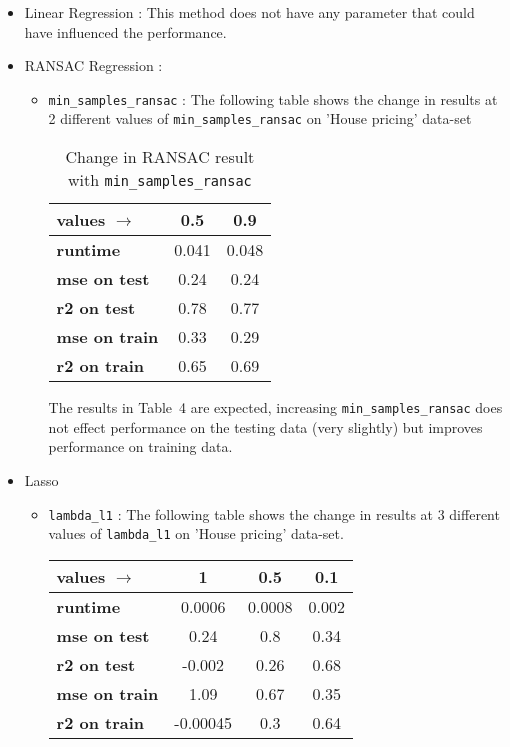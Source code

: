 \documentclass[12pt]{article}
\begin{document}
\begin{itemize}
\item Linear Regression : This method does not have any parameter that could have influenced the performance.
\item RANSAC Regression : 
\begin{itemize}
\item \texttt{min\_samples\_ransac} : The following table shows the change in results at 2 different values of \texttt{min\_samples\_ransac} on 'House pricing' data-set
\begin{table}[!hptb]
\centering
\begin{tabular}{|l|c|c|}
\hline
\textbf{values $\to$} & \textbf{0.5} & \textbf{0.9}  \\\hline
\textbf{runtime} & 0.041 & 0.048 \\
\textbf{mse on test} & 0.24 & 0.24 \\
\textbf{r2 on test} & 0.78 & 0.77 \\
\textbf{mse on train} & 0.33 & 0.29 \\
\textbf{r2 on train} & 0.65 & 0.69 \\\hline
\end{tabular}
\caption{Change in RANSAC result with \texttt{min\_samples\_ransac}}
\end{table}
The results in Table~4 are expected, increasing \texttt{min\_samples\_ransac} does not effect performance on the testing data (very slightly) but improves performance on training data.
\end{itemize}
\item Lasso
\begin{itemize}
\item \texttt{lambda\_l1} : The following table shows the change in results at 3 different values of \texttt{lambda\_l1} on 'House pricing' data-set.
\begin{table}[!hptb]
\centering
\begin{tabular}{|l|c|c|c|}
\hline
\textbf{values $\to$} & \textbf{1} & \textbf{0.5} & \textbf{0.1}  \\\hline
\textbf{runtime} & 0.0006	 & 0.0008 & 0.002 \\
\textbf{mse on test} & 0.24 & 0.8 & 0.34 \\
\textbf{r2 on test} & -0.002 & 0.26 & 0.68 \\
\textbf{mse on train} & 1.09 & 0.67 & 0.35 \\
\textbf{r2 on train} & -0.00045 & 0.3 & 0.64 \\\hline
\end{tabular}

\end{table}
\end{itemize}
\end{itemize}
\end{document}
